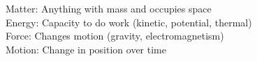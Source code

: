 \documentclass[preview]{standalone}
\begin{document}
Matter: Anything with mass and occupies space\\Energy: Capacity to do work (kinetic, potential, thermal)\\Force: Changes motion (gravity, electromagnetism)\\Motion: Change in position over time\\
\end{document}
